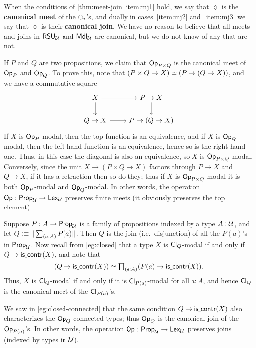 When the conditions of \cref{thm:meet-join}\ref{item:mj1} hold, we say that $\lozenge$ is the \textbf{canonical meet} of the ${\ocircle}_i$'s, and dually in cases~\ref{item:mj2} and~\ref{item:mj3} we say that $\lozenge$ is their \textbf{canonical join}.
We have no reason to believe that all meets and joins in $\mathsf{RSU}_{\mathcal{U}}$ and $\mathsf{Mdl}_{\mathcal{U}}$ are canonical, but we do not know of any that are not.

\begin{eg}
  If $P$ and $Q$ are two propositions, we claim that $\mathsf{Op}_{P\times Q}$ is the canonical meet of $\mathsf{Op}_{P}$ and $\mathsf{Op}_{Q}$.
  To prove this, note that $(P\times Q \to X) \simeq (P\to (Q\to X))$, and we have a commutative square
  \[
  \begin{tikzcd}
    X \ar[r] \ar[d] & P\to X \ar[d] \\ Q\to X \ar[r] & P\to (Q\to X)
  \end{tikzcd}
  \]
  If $X$ is $\mathsf{Op}_{P}$-modal, then the top function is an equivalence, and if $X$ is $\mathsf{Op}_{Q}$-modal, then the left-hand function is an equivalence, hence so is the right-hand one.
  Thus, in this case the diagonal is also an equivalence, so $X$ is $\mathsf{Op}_{P\times Q}$-modal.
  Conversely, since the unit $X\to (P\times Q \to X)$ factors through $P\to X$ and $Q\to X$, if it has a retraction then so do they; thus if $X$ is $\mathsf{Op}_{P\times Q}$-modal it is both $\mathsf{Op}_{P}$-modal and $\mathsf{Op}_{Q}$-modal.
  In other words, the operation $\mathsf{Op}_{} : \mathsf{Prop}_{\mathcal{U}} \to \mathsf{Lex}_{\mathcal{U}}$ preserves finite meets (it obviously preserves the top element).
\end{eg}

\begin{eg}
  Suppose $P:A\to\mathsf{Prop}_{\mathcal{U}}$ is a family of propositions indexed by a type $A:\mathcal{U}$, and let $Q \defeq \brck{\sm{a:A} P(a)}$.
  Then $Q$ is the join (i.e.\ disjunction) of all the $P(a)$'s in $\mathsf{Prop}_{\mathcal{U}}$.
  Now recall from \cref{eg:closed} that a type $X$ is $\mathsf{Cl}_{Q}$-modal if and only if $Q\to\mathsf{is\underline{\ }{}contr}(X)$, and note that
  \[ (Q \to \iscontr(X)) \eqvsym \prd{a:A} (P(a) \to \iscontr(X)). \]
  Thus, $X$ is $\mathsf{Cl}_{Q}$-modal if and only if it is $\mathsf{Cl}_{P(a)}$-modal for all $a:A$, and hence $\mathsf{Cl}_{Q}$ is the canonical meet of the $\mathsf{Cl}_{P(a)}$'s.

  We saw in \cref{eg:closed-connected} that the same condition $Q\to\mathsf{is\underline{\ }{}contr}(X)$ also characterizes the $\mathsf{Op}_{Q}$-connected types; thus $\mathsf{Op}_{Q}$ is the canonical join of the $\mathsf{Op}_{P(a)}$'s.
  In other words, the operation $\mathsf{Op}_{} : \mathsf{Prop}_{\mathcal{U}} \to \mathsf{Lex}_{\mathcal{U}}$ preserves joins (indexed by types in $\mathcal{U}$).
\end{eg}

